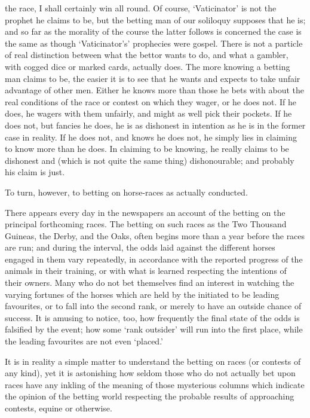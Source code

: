 \documentclass[letterpaper,12pt,oneside,openany]{memoir}
\begin{document}
the race, I shall certainly win all round. Of course,
`Vaticinator' is not the prophet he claims to be, but
the betting man of our soliloquy supposes that he is;
and so far as the morality of the course the latter follows
is concerned the case is the same as though `Vaticinator's'
prophecies were gospel. There is not a particle
of real distinction between what the bettor wants to do,
and what a gambler, with cogged dice or marked cards,
actually does. The more knowing a betting man claims
to be, the easier it is to see that he wants and expects
to take unfair advantage of other men. Either he
knows more than those he bets with about the real
conditions of the race or contest on which they wager,
or he does not. If he does, he wagers with them unfairly,
and might as well pick their pockets. If he does
not, but fancies he does, he is as dishonest in intention
as he is in the former case in reality. If he does not,
and knows he does not, he simply lies in claiming to
know more than he does. In claiming to be knowing,
he really claims to be dishonest and (which is not
quite the same thing) dishonourable; and probably his
claim is just.

To turn, however, to betting on horse-races as actually
conducted.

There appears every day in the newspapers an
account of the betting on the principal forthcoming
races. The betting on such races as the Two Thousand
Guineas, the Derby, and the Oaks, often begins more
than a year before the races are run; and during the
interval, the odds laid against the different horses
engaged in them vary repeatedly, in accordance with
the reported progress of the animals in their training,
or with what is learned respecting the intentions of
their owners. Many who do not bet themselves find
an interest in watching the varying fortunes of the
horses which are held by the initiated to be leading
favourites, or to fall into the second rank, or merely to
have an outside chance of success. It is amusing to
notice, too, how frequently the final state of the odds is
falsified by the event; how some `rank outsider' will
run into the first place, while the leading favourites are
not even `placed.'

It is in reality a simple matter to understand the
betting on races (or contests of any kind), yet it is
astonishing how seldom those who do not actually bet
upon races have any inkling of the meaning of those
mysterious columns which indicate the opinion of the
betting world respecting the probable results of approaching
contests, equine or otherwise.
\end{document}

